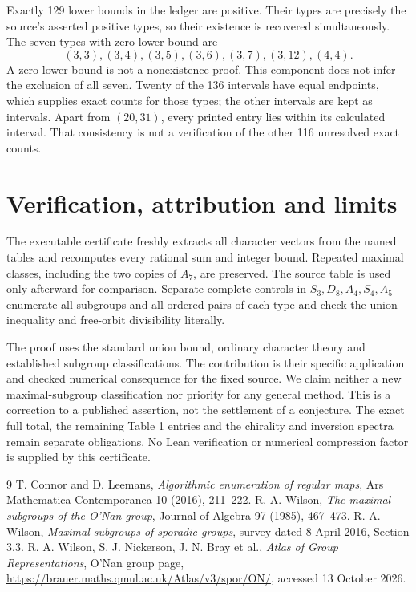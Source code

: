 \documentclass[11pt,a4paper]{article}
\begin{document}
Exactly 129 lower bounds in the ledger are positive. Their types are
precisely the source's asserted positive types, so their existence is
recovered simultaneously. The seven types with zero lower bound are
\[
 (3,3),(3,4),(3,5),(3,6),(3,7),(3,12),(4,4).
\]
A zero lower bound is not a nonexistence proof. This component does
not infer the exclusion of all seven. Twenty of the 136 intervals have
equal endpoints, which supplies exact counts for those types; the
other intervals are kept as intervals. Apart from $(20,31)$, every
printed entry lies within its calculated interval. That consistency
is not a verification of the other 116 unresolved exact counts.

\section{Verification, attribution and limits}
The executable certificate freshly extracts all character vectors from
the named tables and recomputes every rational sum and integer bound.
Repeated maximal classes, including the two copies of $A_7$, are
preserved. The source table is used only afterward for comparison.
Separate complete controls in $S_3,D_8,A_4,S_4,A_5$ enumerate all
subgroups and all ordered pairs of each type and check the union
inequality and free-orbit divisibility literally.

The proof uses the standard union bound, ordinary character theory
and established subgroup classifications. The contribution is their
specific application and checked numerical consequence for the fixed
source. We claim neither a new maximal-subgroup classification nor
priority for any general method. This is a correction to a published
assertion, not the settlement of a conjecture. The exact full total,
the remaining Table 1 entries and the chirality and inversion spectra
remain separate obligations. No Lean verification or numerical
compression factor is supplied by this certificate.

\begin{thebibliography}{9}
 T. Connor and D. Leemans, \emph{Algorithmic enumeration of
regular maps}, Ars Mathematica Contemporanea 10 (2016), 211--222.
 R. A. Wilson, \emph{The maximal subgroups of the O'Nan
group}, Journal of Algebra 97 (1985), 467--473.
 R. A. Wilson, \emph{Maximal subgroups of sporadic groups},
survey dated 8 April 2016, Section 3.3.
 R. A. Wilson, S. J. Nickerson, J. N. Bray et al.,
\emph{Atlas of Group Representations}, O'Nan group page,
\url{https://brauer.maths.qmul.ac.uk/Atlas/v3/spor/ON/},
accessed 13 October 2026.
\end{thebibliography}
\end{document}
